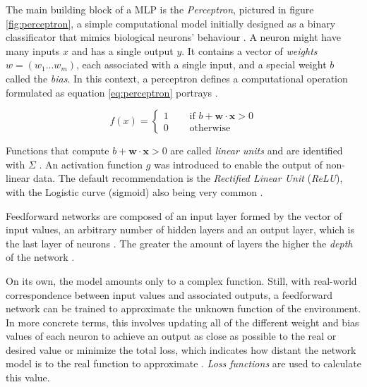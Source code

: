 The main building block of a \ac{MLP} is the \textit{Perceptron}, pictured in figure \ref{fig:perceptron}, a simple computational model initially designed as a binary classificator that mimics biological neurons' behaviour \cite{charniakIntroductionDeepLearning2018}. A neuron might have many inputs $x$ and has a single output $y$. It contains a vector of \textit{weights} $w = (w_1 ... w_m)$, each associated with a single input, and a special weight $b$ called the \textit{bias}. In this context, a perceptron defines a computational operation formulated as equation \ref{eq:perceptron} portrays \cite{charniakIntroductionDeepLearning2018}. \par

\begin{equation}\label{eq:perceptron}
	f(x) =
	\left\{ \begin{aligned} 
		1 &\quad \text{ if } b + \textbf{w} \cdot \textbf{x} > 0\\
		0 &\quad \text{ otherwise} 
	\end{aligned} \right.
\end{equation}

Functions that compute $b + \textbf{w} \cdot \textbf{x} > 0$ are called \textit{linear units} and are identified with $\Sigma$ \cite{charniakIntroductionDeepLearning2018, goodfellowDeepLearning2016}. An activation function $g$ was introduced to enable the output of non-linear data. The default recommendation is the \textit{Rectified Linear Unit} (\textit{ReLU}), with the Logistic curve (sigmoid) also being very common \cite{goodfellowDeepLearning2016}.  \par
Feedforward networks are composed of an input layer formed by the vector of input values, an arbitrary number of hidden layers and an output layer, which is the last layer of neurons \cite{charniakIntroductionDeepLearning2018}. The greater the amount of layers the higher the \textit{depth} of the network \cite{charniakIntroductionDeepLearning2018, goodfellowDeepLearning2016}. \par
On its own, the model amounts only to a complex function. Still, with real-world correspondence between input values and associated outputs, a feedforward network can be trained to approximate the unknown function of the environment. In more concrete terms, this involves updating all of the different weight and bias values of each neuron to achieve an output as close as possible to the real or desired value or minimize the total loss, which indicates how distant the network model is to the real function to approximate \cite{charniakIntroductionDeepLearning2018, goodfellowDeepLearning2016}. \textit{Loss functions} are used to calculate this value.

